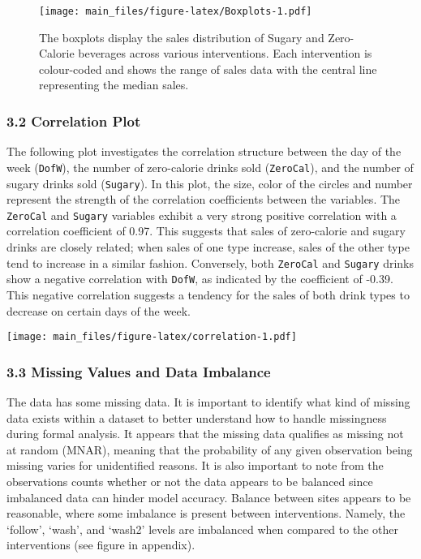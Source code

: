 \documentclass[
]{article}
\begin{document}
\begin{figure}
\centering
\texttt{[image: main\_files/figure-latex/Boxplots-1.pdf]}
\caption{The boxplots display the sales distribution of Sugary and
Zero-Calorie beverages across various interventions. Each intervention
is colour-coded and shows the range of sales data with the central line
representing the median sales.}
\end{figure}

\hypertarget{correlation-plot}{%
\subsubsection{3.2 Correlation Plot}\label{correlation-plot}}

The following plot investigates the correlation structure between the
day of the week (\texttt{DofW}), the number of zero-calorie drinks sold
(\texttt{ZeroCal}), and the number of sugary drinks sold
(\texttt{Sugary}). In this plot, the size, color of the circles and
number represent the strength of the correlation coefficients between
the variables. The \texttt{ZeroCal} and \texttt{Sugary} variables
exhibit a very strong positive correlation with a correlation
coefficient of 0.97. This suggests that sales of zero-calorie and sugary
drinks are closely related; when sales of one type increase, sales of
the other type tend to increase in a similar fashion. Conversely, both
\texttt{ZeroCal} and \texttt{Sugary} drinks show a negative correlation
with \texttt{DofW}, as indicated by the coefficient of -0.39. This
negative correlation suggests a tendency for the sales of both drink
types to decrease on certain days of the week.

\texttt{[image: main\_files/figure-latex/correlation-1.pdf]}

\hypertarget{missing-values-and-data-imbalance}{%
\subsubsection{3.3 Missing Values and Data
Imbalance}\label{missing-values-and-data-imbalance}}

The data has some missing data. It is important to identify what kind of
missing data exists within a dataset to better understand how to handle
missingness during formal analysis. It appears that the missing data
qualifies as missing not at random (MNAR), meaning that the probability
of any given observation being missing varies for unidentified reasons.
It is also important to note from the observations counts whether or not
the data appears to be balanced since imbalanced data can hinder model
accuracy. Balance between sites appears to be reasonable, where some
imbalance is present between interventions. Namely, the `follow',
`wash', and `wash2' levels are imbalanced when compared to the other
interventions (see figure in appendix).
\end{document}
